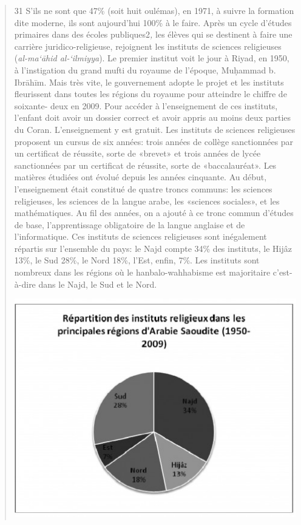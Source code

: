 \begin{quote}
31 S'ils ne sont que 47\% (soit huit oulémas), en 1971, à suivre la
formation dite moderne,
ils sont aujourd'hui 100\% à le faire. Après un cycle d'études primaires
dans des écoles publiques2\emph{,} les élèves qui se destinent à faire
une carrière juridico-religieuse, rejoignent les instituts de sciences
religieuses (\emph{al-ma`āhid al-`ilmiyya}). Le premier institut voit le
jour à Riyad, en 1950, à l'instigation du grand mufti du royaume de
l'époque, Muḥammad b. Ibrāhīm. Mais très vite, le gouvernement adopte le
projet et les instituts fleurissent dans toutes les régions du royaume
pour atteindre le chiffre de soixante- deux en 2009. Pour accéder à
l'enseignement de ces instituts, l'enfant doit avoir un dossier correct
et avoir appris au moins deux parties du Coran. L'enseignement y est
gratuit. Les instituts de sciences religieuses proposent un cursus de
six années: trois années de collège sanctionnées par un certificat de
réussite, sorte de «brevet» et trois années de lycée sanctionnées par un
certificat de réussite, sorte de «baccalauréat». Les matières étudiées
ont évolué depuis les années cinquante. Au début, l'enseignement était
constitué de quatre troncs communs: les sciences religieuses, les
sciences de la langue arabe, les «sciences sociales», et les
mathématiques. Au fil des années, on a ajouté à ce tronc commun d'études
de base, l'apprentissage obligatoire de la langue anglaise et de
l'informatique. Ces instituts de sciences religieuses sont inégalement
répartis sur l'ensemble du pays: le Najd compte 34\% des instituts, le
Hijâz 13\%, le Sud 28\%, le Nord 18\%, l'Est, enfin, 7\%. Les instituts
sont nombreux dans les régions où le hanbalo-wahhabisme est majoritaire
c'est-à-dire dans le Najd, le Sud et le Nord.

\begin{marginfigure}
\includegraphics[width=1.2\textwidth]{CourantsIslamContemporain/ImagesCourantsIslamContemporain/image13.jpeg}
\end{marginfigure}


\end{quote}
